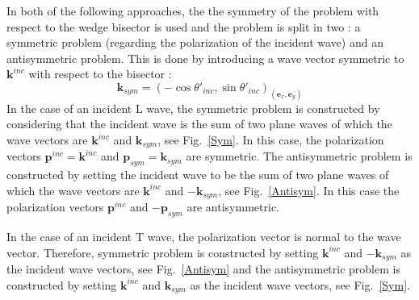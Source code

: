 In both of the following approaches, the the symmetry of the problem with respect to the wedge bisector is used and the problem is split in two : a symmetric problem (regarding the polarization of the incident wave) and an antisymmetric problem. This is done by introducing a wave vector symmetric to $\mathbf{k}^{inc}$ with respect to the bisector :
\begin{equation}
\mathbf{k}_{sym}=(-\cos\theta'_{inc},\sin\theta'_{inc})_{(\mathbf{e}_x,\mathbf{e}_y)}
\end{equation}
In the case of an incident L wave, the symmetric problem is constructed by considering that the incident wave is the sum of two plane waves of which the wave vectors are $\mathbf{k}^{inc}$ and $\mathbf{k}_{sym}$, see Fig.~\ref{Sym}. In this case, the polarization vectors $\mathbf{p}^{inc}=\mathbf{k}^{inc}$ and $\mathbf{p}_{sym}=\mathbf{k}_{sym}$ are symmetric. The antisymmetric problem is constructed by setting the incident wave to be the sum of two plane waves of which the wave vectors are $\mathbf{k}^{inc}$ and $-\mathbf{k}_{sym}$, see Fig.~\ref{Antisym}. In this case the polarization vectors $\mathbf{p}^{inc}$ and $-\mathbf{p}_{sym}$ are antisymmetric.

In the case of an incident T wave, the polarization vector is normal to the wave vector. Therefore, symmetric problem is constructed by setting $\mathbf{k}^{inc}$ and $-\mathbf{k}_{sym}$ as the incident wave vectors, see Fig.~\ref{Antisym} and the antisymmetric problem is constructed by setting $\mathbf{k}^{inc}$ and $\mathbf{k}_{sym}$ as the incident wave vectors, see Fig.~\ref{Sym}.

